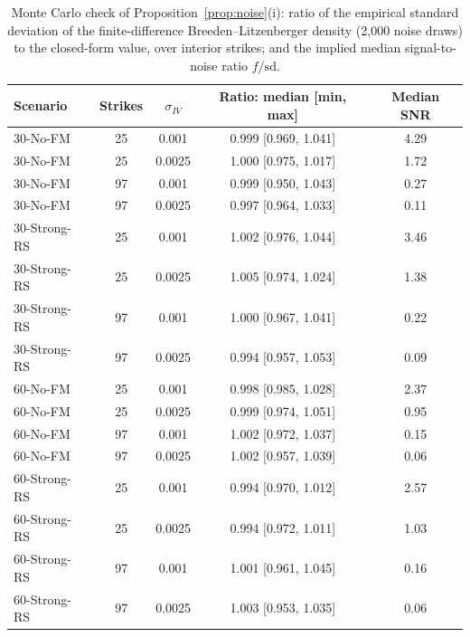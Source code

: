 \begin{table}[htbp]
\centering
\caption{Monte Carlo check of Proposition~\ref{prop:noise}(i): ratio of the empirical standard deviation of the finite-difference Breeden--Litzenberger density (2{,}000 noise draws) to the closed-form value, over interior strikes; and the implied median signal-to-noise ratio $f/\mathrm{sd}$.}
\label{tab:theory}
\small
\begin{tabular}{lcccc}
\toprule
Scenario & Strikes & $\sigma_{IV}$ & Ratio: median [min, max] & Median SNR \\
\midrule
30-No-FM & 25 & 0.001 & 0.999 [0.969, 1.041] & 4.29 \\
30-No-FM & 25 & 0.0025 & 1.000 [0.975, 1.017] & 1.72 \\
30-No-FM & 97 & 0.001 & 0.999 [0.950, 1.043] & 0.27 \\
30-No-FM & 97 & 0.0025 & 0.997 [0.964, 1.033] & 0.11 \\
30-Strong-RS & 25 & 0.001 & 1.002 [0.976, 1.044] & 3.46 \\
30-Strong-RS & 25 & 0.0025 & 1.005 [0.974, 1.024] & 1.38 \\
30-Strong-RS & 97 & 0.001 & 1.000 [0.967, 1.041] & 0.22 \\
30-Strong-RS & 97 & 0.0025 & 0.994 [0.957, 1.053] & 0.09 \\
60-No-FM & 25 & 0.001 & 0.998 [0.985, 1.028] & 2.37 \\
60-No-FM & 25 & 0.0025 & 0.999 [0.974, 1.051] & 0.95 \\
60-No-FM & 97 & 0.001 & 1.002 [0.972, 1.037] & 0.15 \\
60-No-FM & 97 & 0.0025 & 1.002 [0.957, 1.039] & 0.06 \\
60-Strong-RS & 25 & 0.001 & 0.994 [0.970, 1.012] & 2.57 \\
60-Strong-RS & 25 & 0.0025 & 0.994 [0.972, 1.011] & 1.03 \\
60-Strong-RS & 97 & 0.001 & 1.001 [0.961, 1.045] & 0.16 \\
60-Strong-RS & 97 & 0.0025 & 1.003 [0.953, 1.035] & 0.06 \\
\bottomrule
\end{tabular}
\end{table}
